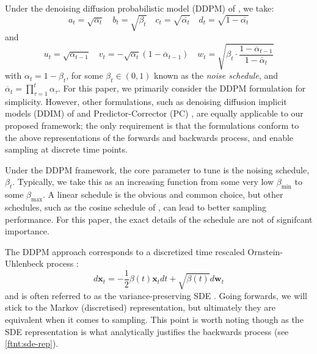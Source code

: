 \begin{remark}
    Under the denoising diffusion probabilistic model (DDPM) of
    \textcite{hoDenoisingDiffusionProbabilistic2020}, we take:
    \begin{equation}
        a_t = \sqrt{\alpha_t} \quad
        b_t = \sqrt{\beta_t} \quad
        c_t = \sqrt{\overline{\alpha_t}} \quad
        d_t = \sqrt{1 - \overline{\alpha_t}}
    \end{equation}
    and
    \begin{equation}
        u_t = \sqrt{\alpha_{t-1}} \quad
        v_t = -\sqrt{\alpha_t}(1 - \overline{\alpha}_{t-1}) \quad
        w_t = \sqrt{\beta_t \cdot \frac{1 - \overline{\alpha}_{t-1}}{1 - \overline{\alpha}_t}}
    \end{equation}
    with $\alpha_t = 1 - \beta_t$, for some $\beta_t \in (0, 1)$ known as the \emph{noise schedule},
    and $\overline{\alpha}_t = \prod_{\tau=1}^{t}\alpha_\tau$.
    For this paper, we primarily consider the DDPM formulation for simplicity. However, other
    formulations, such as denoising diffusion implicit models (DDIM) of
    \textcite{songDenoisingDiffusionImplicit2020} and Predictor-Corrector (PC)
    \textcite{songScoreBasedGenerativeModeling2021}, are equally applicable to our proposed framework;
    the only requirement is that the formulations conform to the above representations of the forwards
    and backwards process, and enable sampling at discrete time points.
\end{remark}

\begin{remark}
    Under the DDPM framework, the core parameter to tune is the noising schedule, $\beta_t$.
    Typically, we take this as an increasing function from some very low $\beta_{\text{min}}$ to
    some $\beta_{\text{max}}$. A linear schedule is the obvious and common choice, but other
    schedules, such as the cosine schedule of \textcite{nicholImprovedDenoisingDiffusion2021}, can
    lead to better sampling performance. For this paper, the exact details of the schedule are not
    of signifcant importance.
\end{remark}

\begin{remark}
    The DDPM approach corresponds to a discretized time rescaled Ornstein-Uhlenbeck process
    \parencite{boysTweedieMomentProjected2023,songScoreBasedGenerativeModeling2021}:
    $$
    d\mathbf{x}_t = -\frac{1}{2}\beta(t)\mathbf{x}_t dt + \sqrt{\beta(t)}d\mathbf{w}_t
    $$
    and is often referred to as the variance-preserving SDE
    \parencite{songScoreBasedGenerativeModeling2021}. Going forwards, we will stick to the Markov
    (discretised) representation, but ultimately they are equivalent when it comes to sampling.
    This point is worth noting though as the SDE representation is what analytically justifies the
    backwards process (see \ref{ftnt:sde-rep}).
\end{remark}

